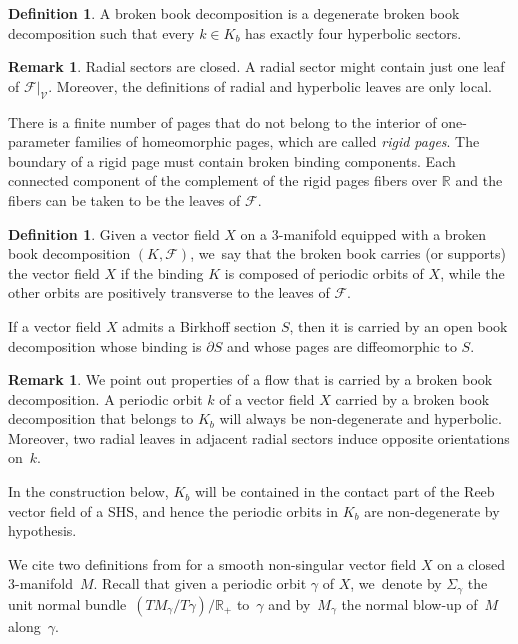 \documentclass[11pt]{article}
\newcommand{\threemanifold}{$3$\nobreakdash-mani\-fold\xspace}
\theoremstyle{definition}
\newtheorem{defi}[theorem]{Definition}
\newtheorem{Remark}[theorem]{Remark}
\newcommand\R{\mathbb{R}}
\begin{document}
\begin{defi}\label{defn:BBD2}
A broken book decomposition is a degenerate broken book decomposition such that every $k\in K_b$ has exactly four hyperbolic sectors.
\end{defi}

\begin{Remark}
Radial sectors are closed. A radial sector might contain just one leaf of $\mathcal{F}|_{\mathcal{V}}$. Moreover, the definitions of radial and hyperbolic leaves are only local.
\end{Remark}

There is a finite number of pages that do not belong to the interior of one-parameter families of homeomorphic pages, which are called \emph{rigid pages}. The boundary of a rigid page must contain broken binding components. Each connected component of the complement of the rigid pages fibers over $\mathbb{R}$ and the fibers can be taken to be the leaves of $\mathcal{F}$.

\begin{defi}
Given a vector field $X$ on a \threemanifold equipped with a broken book decomposition $(K,\mathcal{F})$, we~say that the broken book carries (or supports) the vector field $X$ if the binding $K$ is composed of periodic orbits of $X$, while the other orbits are positively transverse to the leaves of $\mathcal{F}$.
\end{defi}

If a vector field $X$ admits a Birkhoff section $S$, then it is carried by an open book decomposition whose binding is $\partial S$ and whose pages are diffeomorphic to $S$.

\begin{Remark}\label{rem:orientation}
We point out properties of a flow that is carried by a broken book decomposition. A periodic orbit $k$ of a vector field $X$ carried by a broken book decomposition that belongs to $K_b$ will always be non-degenerate and hyperbolic. Moreover, two radial leaves in adjacent radial sectors induce opposite orientations on~$k$.
\end{Remark}

In the construction below, $K_b$ will be contained in the contact part of the Reeb vector field of a SHS, and hence the periodic orbits in $K_b$ are non-degenerate by hypothesis.

We cite two definitions from \cite{CDR} for a smooth non-singular vector field $X$ on a closed \threemanifold~$M$. Recall that given a periodic orbit $\gamma$ of $X$, we~denote by $\Sigma_\gamma$ the unit normal bundle~$(TM_\gamma/T\gamma)/\R_+$ to~$\gamma$ and by~$M_\gamma$ the normal blow-up of~$M$ along~$\gamma$.
\end{document}
